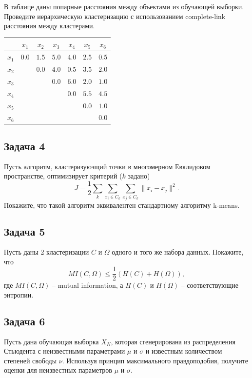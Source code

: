 \documentclass[12pt,a4paper]{article}
\begin{document}
В таблице даны попарные расстояния между объектами из обучающей выборки. Проведите иерархическую кластеризацию с использованием complete-link расстояния между кластерами.

\begin{center}
\begin{tabular}{l | c c c c c c}
 & $x_1$ & $x_2$ & $x_3$ & $x_4$ & $x_5$ & $x_6$ \\
\hline
$x_1$ & $0.0$ & $1.5$ & $5.0$ & $4.0$ & $2.5$ & $0.5$ \\
$x_2$ & & $0.0$ & $4.0$ & $0.5$ & $3.5$ & $2.0$ \\
$x_3$ & & & $0.0$ & $6.0$ & $2.0$ & $1.0$ \\
$x_4$ & & & & $0.0$ & $5.5$ & $4.5$ \\
$x_5$ & & & & & $0.0$ & $1.0$ \\
$x_6$ & & & & & & $0.0$ \\
\end{tabular}
\end{center}

\subsection*{Задача 4}

Пусть алгоритм, кластеризуюзщий точки в многомерном Евклидовом пространстве, оптимизирует критерий ($k$ задано)
\[
J = \frac{1}{2}\sum_{k} \sum_{x_i \in C_k} \sum_{x_j \in C_k} \| x_i - x_j \|^2.
\]
Покажите, что такой алгоритм эквивалентен стандартному алгоритму k-means.

\subsection*{Задача 5}

Пусть даны 2 кластеризации $C$ и $\Omega$ одного и того же набора данных. Покажите, что
\[
MI(C, \Omega) \leq \frac{1}{2} (H(C) + H(\Omega)),
\]
где $MI(C, \Omega)$ -- mutual information, а $H(C)$ и $H(\Omega)$ -- соответствующие энтропии.

\subsection*{Задача 6}

Пусть дана обучающая выборка $X_N$, которая сгенерирована из распределения Стьюдента с неизвестными параметрами $\mu$  и $\sigma$ и известным количеством степеней свободы $\nu$. Используя принцип максимального правдоподобия, получите оценки для неизвестных параметров $\mu$ и $\sigma$.
\end{document}

